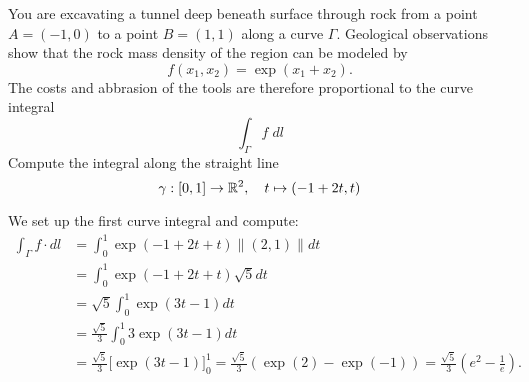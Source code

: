 \documentclass[11pt]{article}
\begin{document}
\begin{exercise}
    You are excavating a tunnel deep beneath surface through rock from a point $A=(-1,0)$ to a point $B=(1,1)$ along a curve $\Gamma$.
    Geological observations show that the rock mass density of the region can be modeled by 
    \[
        f(x_1,x_2) = \exp(x_1+x_2).
    \]
    The costs and abbrasion of the tools are therefore proportional to the curve integral
    \[
        \int_\Gamma f \; dl
    \]
    Compute the integral along the straight line 
    \[
        \gamma : [0,1] \rightarrow \mathbb{R}^2, \quad t \mapsto (-1+2t, t)
    \]
\end{exercise}
\begin{solution}
    We set up the first curve integral and compute:
    \begin{align*}
        \int_\Gamma f \cdot dl
        &=
        \int_0^1 \exp(-1+2t+t) \|(2,1)\| dt
        \\&=
        \int_0^1 \exp(-1+2t+t) \sqrt{5} dt
        \\&=
        \sqrt{5} \int_0^1 \exp(3t-1) dt
        \\&=
        \frac{\sqrt{5}}{3} 
        \int_0^1 3 \exp(3t-1) dt
        \\&=
        \frac{\sqrt{5}}{3} 
        \Big[ \exp(3t-1) \Big]_0^1
        =
        \frac{\sqrt{5}}{3} 
        \left( \exp(2) - \exp(-1) \right)
        =
        \frac{\sqrt{5}}{3} 
        \left( e^2 - \frac{1}{e} \right)
        .
    \end{align*}
\end{solution}
\end{document}
